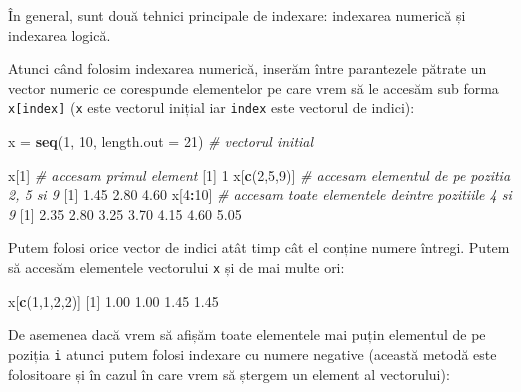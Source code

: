 \documentclass[]{article}
\newenvironment{Shaded}{\begin{snugshade}}{\end{snugshade}}
\newcommand{\CommentTok}[1]{\textcolor[rgb]{0.56,0.35,0.01}{\textit{#1}}}
\newcommand{\DataTypeTok}[1]{\textcolor[rgb]{0.13,0.29,0.53}{#1}}
\newcommand{\DecValTok}[1]{\textcolor[rgb]{0.00,0.00,0.81}{#1}}
\newcommand{\FloatTok}[1]{\textcolor[rgb]{0.00,0.00,0.81}{#1}}
\newcommand{\KeywordTok}[1]{\textcolor[rgb]{0.13,0.29,0.53}{\textbf{#1}}}
\newcommand{\NormalTok}[1]{#1}
\newcommand{\OperatorTok}[1]{\textcolor[rgb]{0.81,0.36,0.00}{\textbf{#1}}}
\newcommand{\StringTok}[1]{\textcolor[rgb]{0.31,0.60,0.02}{#1}}
\begin{document}
În general, sunt două tehnici principale de indexare: indexarea numerică
și indexarea logică.

Atunci când folosim indexarea numerică, inserăm între parantezele
pătrate un vector numeric ce corespunde elementelor pe care vrem să le
accesăm sub forma \texttt{x{[}index{]}} (\texttt{x} este vectorul
inițial iar \texttt{index} este vectorul de indici):

\begin{Shaded}
\begin{Highlighting}[]
\NormalTok{x =}\StringTok{ }\KeywordTok{seq}\NormalTok{(}\DecValTok{1}\NormalTok{, }\DecValTok{10}\NormalTok{, }\DataTypeTok{length.out =} \DecValTok{21}\NormalTok{) }\CommentTok{# vectorul initial }

\NormalTok{x[}\DecValTok{1}\NormalTok{] }\CommentTok{# accesam primul element}
\NormalTok{[}\DecValTok{1}\NormalTok{] }\DecValTok{1}
\NormalTok{x[}\KeywordTok{c}\NormalTok{(}\DecValTok{2}\NormalTok{,}\DecValTok{5}\NormalTok{,}\DecValTok{9}\NormalTok{)] }\CommentTok{# accesam elementul de pe pozitia 2, 5 si 9}
\NormalTok{[}\DecValTok{1}\NormalTok{] }\FloatTok{1.45} \FloatTok{2.80} \FloatTok{4.60}
\NormalTok{x[}\DecValTok{4}\OperatorTok{:}\DecValTok{10}\NormalTok{] }\CommentTok{# accesam toate elementele deintre pozitiile 4 si 9}
\NormalTok{[}\DecValTok{1}\NormalTok{] }\FloatTok{2.35} \FloatTok{2.80} \FloatTok{3.25} \FloatTok{3.70} \FloatTok{4.15} \FloatTok{4.60} \FloatTok{5.05}
\end{Highlighting}
\end{Shaded}

Putem folosi orice vector de indici atât timp cât el conține numere
întregi. Putem să accesăm elementele vectorului \texttt{x} și de mai
multe ori:

\begin{Shaded}
\begin{Highlighting}[]
\NormalTok{x[}\KeywordTok{c}\NormalTok{(}\DecValTok{1}\NormalTok{,}\DecValTok{1}\NormalTok{,}\DecValTok{2}\NormalTok{,}\DecValTok{2}\NormalTok{)]}
\NormalTok{[}\DecValTok{1}\NormalTok{] }\FloatTok{1.00} \FloatTok{1.00} \FloatTok{1.45} \FloatTok{1.45}
\end{Highlighting}
\end{Shaded}

De asemenea dacă vrem să afișăm toate elementele mai puțin elementul de
pe poziția \texttt{i} atunci putem folosi indexare cu numere negative
(această metodă este folositoare și în cazul în care vrem să ștergem un
element al vectorului):
\end{document}
